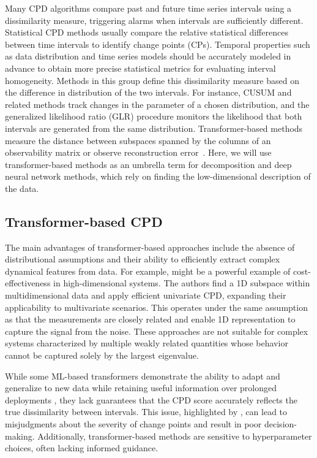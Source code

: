 
Many CPD algorithms compare past and future time series intervals using a dissimilarity measure, triggering alarms when intervals are sufficiently different. Statistical CPD methods usually compare the relative statistical differences between time intervals to identify change points (CPs). Temporal properties such as data distribution and time series models should be accurately modeled in advance to obtain more precise statistical metrics for evaluating interval homogeneity. Methods in this group define this dissimilarity measure based on the difference in distribution of the two intervals. For instance, CUSUM and related methods \citet{Ye2023} track changes in the parameter of a chosen distribution, and the generalized likelihood ratio (GLR) procedure \citet{Xie2013, Korycki2021} monitors the likelihood that both intervals are generated from the same distribution. Transformer-based methods measure the distance between subspaces spanned by the columns of an observability matrix \citet{Moskvina2003, Kawahara2007} or observe reconstruction error~\citep{DeRyck2021, Bao2024}. Here, we will use transformer-based methods as an umbrella term for decomposition and deep neural network methods, which rely on finding the low-dimensional description of the data.  %

\subsection{Transformer-based CPD}
The main advantages of transformer-based approaches include the absence of distributional assumptions and their ability to efficiently extract complex dynamical features from data. For example, \citet{Hirabaru2016} might be a powerful example of cost-effectiveness in high-dimensional systems. The authors find a 1D subspace within multidimensional data and apply efficient univariate CPD, expanding their applicability to multivariate scenarios. This operates under the same assumption as \citet{Fathy2019} that the measurements are closely related and enable 1D representation to capture the signal from the noise. These approaches are not suitable for complex systems characterized by multiple weakly related quantities whose behavior cannot be captured solely by the largest eigenvalue.

While some ML-based transformers demonstrate the ability to adapt and generalize to new data while retaining useful information over prolonged deployments \citep{Corizzo2022}, they lack guarantees that the CPD score accurately reflects the true dissimilarity between intervals. This issue, highlighted by \citet{DeRyck2021}, can lead to misjudgments about the severity of change points and result in poor decision-making. Additionally, transformer-based methods are sensitive to hyperparameter choices, often lacking informed guidance.

